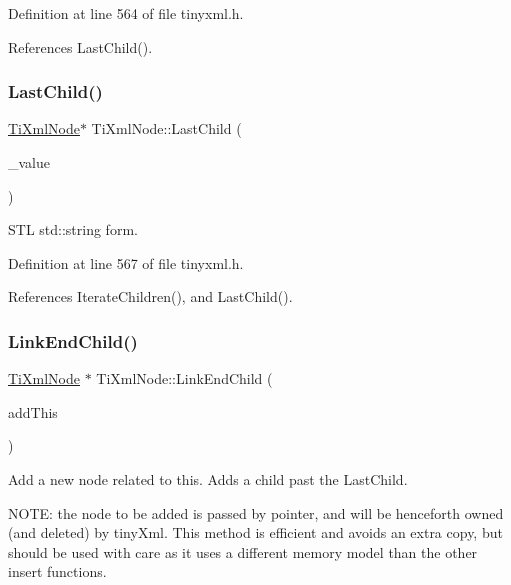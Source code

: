 Definition at line 564 of file tinyxml.\+h.



References Last\+Child().

\hypertarget{class_ti_xml_node_a69772c9202f70553f940b15c06b07be3}{}\label{class_ti_xml_node_a69772c9202f70553f940b15c06b07be3} 
\subsubsection{\texorpdfstring{Last\+Child()}{LastChild()}\hspace{0.1cm}{\footnotesize\ttfamily [6/6]}}
{\footnotesize\ttfamily \hyperlink{class_ti_xml_node}{Ti\+Xml\+Node}$\ast$ Ti\+Xml\+Node\+::\+Last\+Child (\begin{DoxyParamCaption}\item[{const std\+::string \&}]{\+\_\+value }\end{DoxyParamCaption})\hspace{0.3cm}{\ttfamily [inline]}}



S\+TL std\+::string form. 



Definition at line 567 of file tinyxml.\+h.



References Iterate\+Children(), and Last\+Child().

\hypertarget{class_ti_xml_node_a1a881212554b759865f6cac79a851d38}{}\label{class_ti_xml_node_a1a881212554b759865f6cac79a851d38} 
\subsubsection{\texorpdfstring{Link\+End\+Child()}{LinkEndChild()}}
{\footnotesize\ttfamily \hyperlink{class_ti_xml_node}{Ti\+Xml\+Node} $\ast$ Ti\+Xml\+Node\+::\+Link\+End\+Child (\begin{DoxyParamCaption}\item[{\hyperlink{class_ti_xml_node}{Ti\+Xml\+Node} $\ast$}]{add\+This }\end{DoxyParamCaption})}

Add a new node related to this. Adds a child past the Last\+Child.

N\+O\+TE\+: the node to be added is passed by pointer, and will be henceforth owned (and deleted) by tiny\+Xml. This method is efficient and avoids an extra copy, but should be used with care as it uses a different memory model than the other insert functions.

